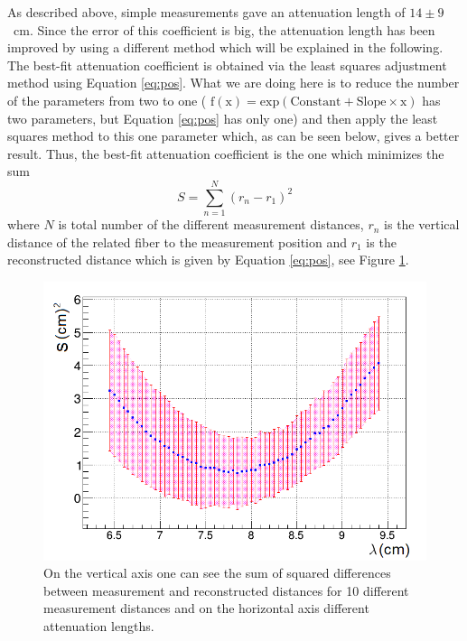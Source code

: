 \documentclass[a4paper]{article}\linespread{1.4}
\begin{document}
As described above, simple measurements gave an attenuation length of $14 \pm 9$~cm. Since the error of this coefficient is big, the attenuation length has been improved by using a different method which will be explained in the following.
\\The best-fit attenuation coefficient is obtained via the least squares adjustment method using Equation \ref{eq:pos}. What we are doing here is to reduce the number of the parameters from two to one ( $\mathrm{f(x) = exp(Constant + Slope\times x)}$ has two parameters, but Equation \ref{eq:pos} has only one) and then apply the least squares method to this one parameter which, as can be seen below, gives a better result.
Thus, the best-fit attenuation coefficient is the one which minimizes the sum
\begin{equation} S=\sum_{n=1}^{N} (r_{n}-r_{1})^{2} \end{equation}
where $N$ is total number of the different measurement distances, $r_{n}$ is the vertical distance of the related fiber to the measurement position 
and $r_{1}$ is the reconstructed distance which is given by Equation \ref{eq:pos}, see Figure \ref{fig:sums}.
\begin{figure}[] \hspace*{-0.7cm} \includegraphics[width=130mm,scale=2.0]{exx.png} \caption {On the vertical axis one can see the
sum of squared differences between measurement and reconstructed distances for 10 different measurement distances and on the horizontal axis different attenuation lengths.} \label{fig:sums} \end{figure}
\end{document}
